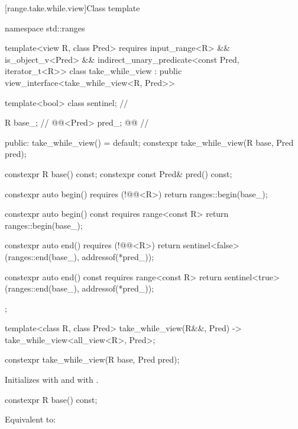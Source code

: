 [range.take.while.view]{Class template }

\begin{codeblock}
namespace std::ranges {
  template<view R, class Pred>
  requires input_range<R> && is_object_v<Pred> &&
    indirect_unary_predicate<const Pred, iterator_t<R>>
  class take_while_view : public view_interface<take_while_view<R, Pred>> {
    template<bool> class sentinel;                      // \expos

    R base_;                                            // \expos
    @@<Pred> pred_; @\itcorr[-1]@                       // \expos

  public:
    take_while_view() = default;
    constexpr take_while_view(R base, Pred pred);

    constexpr R base() const;
    constexpr const Pred& pred() const;

    constexpr auto begin() requires (!@@<R>)
    { return ranges::begin(base_); }

    constexpr auto begin() const requires range<const R>
    { return ranges::begin(base_); }

    constexpr auto end() requires (!@@<R>)
    { return sentinel<false>(ranges::end(base_), addressof(*pred_)); }

    constexpr auto end() const requires range<const R>
    { return sentinel<true>(ranges::end(base_), addressof(*pred_)); }
  };

  template<class R, class Pred>
    take_while_view(R&&, Pred) -> take_while_view<all_view<R>, Pred>;
}
\end{codeblock}

\begin{itemdecl}
constexpr take_while_view(R base, Pred pred);
\end{itemdecl}

\begin{itemdescr}
\pnum
\effects
Initializes  with  and
 with .
\end{itemdescr}

\begin{itemdecl}
constexpr R base() const;
\end{itemdecl}

\begin{itemdescr}
\pnum
\effects
Equivalent to: 
\end{itemdescr}

